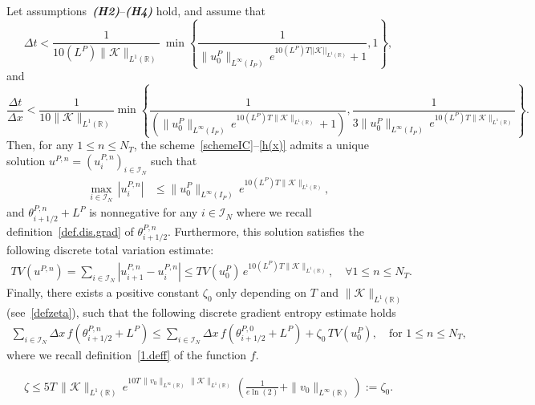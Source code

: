 \documentclass[10pt,a4paper]{amsart}
\newcommand{\I}{\mathcal{I}_N}
\newcommand{\K}{\mathcal{K}}
\newcommand{\R}{\mathbb{R}}
\begin{document}
\begin{theorem}\label{thm.scheme}
Let assumptions~\textbf{\emph{(H2)}}--\textbf{\emph{(H4)}} hold, and assume that
\begin{equation}\label{delta t}
    \Delta t < \frac{1}{10 (L^P) \|\mathcal{K}\|_{L^1 (\mathbb{R})}}\,\min\left\{\frac{1}{\|u^P_0\|_{L^\infty(I_P)}\, e^{10 (L^P) T ||\mathcal{K}||_{L^1(\mathbb{R})}} + 1}, 1\right\},
\end{equation}
and
\begin{equation}\label{delta t over delta x}
   \frac{\Delta t}{\Delta x} < \frac{1}{10 \|\mathcal{K}\|_{L^1 (\mathbb{R})}}
    \min\left\{ 
\frac{1}{\left(\|u^P_0\|_{L^\infty(I_P)}\, e^{10 (L^P)T \|\mathcal{K}\|_{L^1(\mathbb{R})}} + 1\right)}, 
\frac{1}{3 \|u^P_0\|_{L^\infty(I_P)}\, e^{10 (L^P)T \|\mathcal{K}\|_{L^1(\mathbb{R})}}} 
    \right\}.
\end{equation}
Then, for any $1\leq n\leq N_T$, the scheme~\eqref{schemeIC}--\eqref{h(x)} admits a unique solution $u^{P,n} = (u^{P,n}_i)_{i\in\I}$ such that
\begin{align}\label{Linftybounddis}
 \max_{ i \in \I} \, |u_{i}^{P, n}| & \leq \|u^P_0\|_{L^\infty(I_P)} \, e^{10 (L^P) T \|\mathcal{K}\|_{L^1(\mathbb{R})}}, 
\end{align} 
and $\theta_{i + 1/2}^{P, n} + L^P$ is nonnegative for any $i\in\I$ where we recall definition~\eqref{def.dis.grad} of $\theta^{P,n}_{i+1/2}$. Furthermore, this solution satisfies the following discrete total variation estimate:
\begin{align}\label{TVestim}
 TV(u^{P, n} )= \sum_{i \in \I} \left| u^{P,n}_{i+1}-u^{P,n}_i\right| \leq TV(u^P_0 )\, e^{10 (L^P) T \|\mathcal{K}\|_{L^1(\mathbb{R})}}, \quad \forall 1\leq n \leq N_T.
 \end{align}
Finally, there exists a positive constant $\zeta_0$ only depending on $T$ and $\|\mathcal{K}\|_{L^1(\mathbb{R})}$ (see~\eqref{defzeta}), such that the following discrete gradient entropy estimate holds
 \begin{align}\label{gradentdis}
 \sum_{i \in\I} \Delta x \, f\left(\theta_{i + 1/2}^{P, n} + L^P\right) \leq \sum_{i \in \I} \Delta x \, f\left(\theta_{i + 1/2}^{P, 0}+ L^P\right) + \zeta_0 \, TV(u^P_0), \quad \mbox{for } 1\leq n \leq N_T,
\end{align}
where we recall definition~\eqref{1.deff} of the function $f$.
\end{theorem}

\begin{align}\label{defzeta}
    \zeta \leq 5T \, \|\K\|_{L^1(\R)} \, e^{10 T \,\|v_0\|_{L^\infty(\R)} \, \|\K\|_{L^1(\R)}} \, \left(\frac{1}{e \ln(2)}+\|v_0\|_{L^\infty(\R)}\right) :=  \zeta_0.
\end{align}
\end{document}
